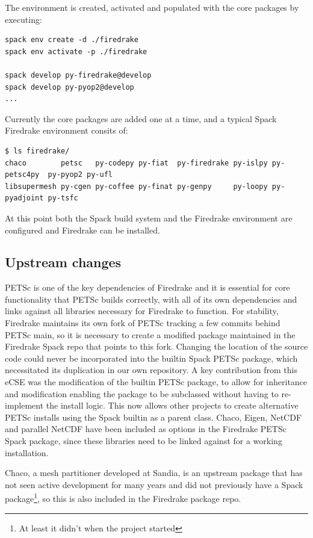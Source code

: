 \documentclass[a4paper,11pt]{article}
\begin{document}
The environment is created, activated and populated with the core packages by executing:
\begin{lstlisting}
spack env create -d ./firedrake
spack env activate -p ./firedrake

spack develop py-firedrake@develop
spack develop py-pyop2@develop
...
\end{lstlisting}

Currently the core packages are added one at a time, and a typical Spack Firedrake environment consits of:
\begin{lstlisting}
$ ls firedrake/
chaco        petsc   py-codepy py-fiat  py-firedrake py-islpy py-petsc4py  py-pyop2 py-ufl
libsupermesh py-cgen py-coffee py-finat py-genpy     py-loopy py-pyadjoint py-tsfc
\end{lstlisting}
At this point both the Spack build system and the Firedrake environment are configured and Firedrake can be installed.


\subsection{Upstream changes}
\label{ssec:changes}
PETSc is one of the key dependencies of Firedrake and it is essential for core functionality that PETSc builds correctly, with all of its own dependencies and links against all libraries necessary for Firedrake to function.
For stability, Firedrake maintains its own fork of PETSc tracking a few commits behind PETSc main, so it is necessary to create a modified package maintained in the Firedrake Spack repo that points to this fork.
Changing the location of the source code could never be incorporated into the builtin Spack PETSc package, which necessitated its duplication in our own repository.
A key contribution from this eCSE was the modification of the builtin PETSc package, to allow for inheritance and modification enabling the package to be subclassed without having to re-implement the install logic.
This now allows other projects to create alternative PETSc installs using the Spack builtin as a parent class.
Chaco, Eigen, NetCDF and parallel NetCDF have been included as options in the Firedrake PETSc Spack package, since these libraries need to be linked against for a working installation.

Chaco, a mesh partitioner developed at Sandia, is an upstream package that has not seen active development for many years and did not previously have a Spack package\footnote{At least it didn't when the project started}, so this is also included in the Firedrake package repo.
\end{document}

